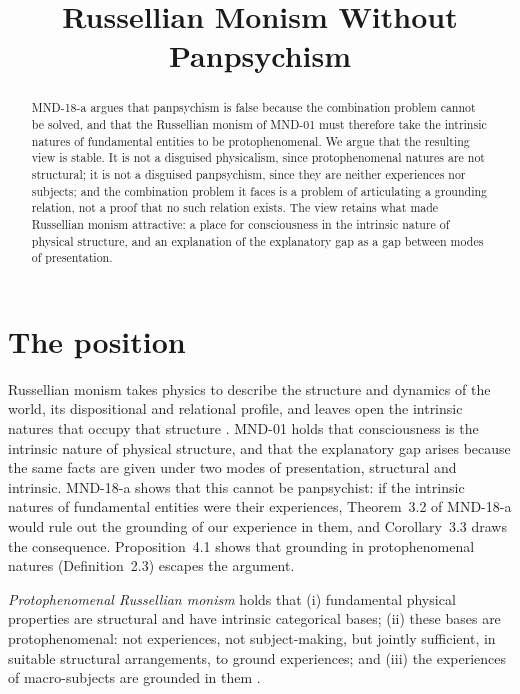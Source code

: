 \documentclass{situationist-preprint}
\title{Russellian Monism Without Panpsychism}
\begin{document}
\maketitle

\begin{abstract}
MND-18-a argues that panpsychism is false because the combination problem cannot be solved, and that the Russellian monism of MND-01 must therefore take the intrinsic natures of fundamental entities to be protophenomenal. We argue that the resulting view is stable. It is not a disguised physicalism, since protophenomenal natures are not structural; it is not a disguised panpsychism, since they are neither experiences nor subjects; and the combination problem it faces is a problem of articulating a grounding relation, not a proof that no such relation exists. The view retains what made Russellian monism attractive: a place for consciousness in the intrinsic nature of physical structure, and an explanation of the explanatory gap as a gap between modes of presentation.
\end{abstract}

\section{The position}

Russellian monism takes physics to describe the structure and dynamics of the world, its dispositional and relational profile, and leaves open the intrinsic natures that occupy that structure \citep{Russell1927}. MND-01 holds that consciousness is the intrinsic nature of physical structure, and that the explanatory gap arises because the same facts are given under two modes of presentation, structural and intrinsic. MND-18-a shows that this cannot be panpsychist: if the intrinsic natures of fundamental entities were their experiences, Theorem~3.2 of MND-18-a would rule out the grounding of our experience in them, and Corollary~3.3 draws the consequence. Proposition~4.1 shows that grounding in protophenomenal natures (Definition~2.3) escapes the argument.

\begin{definition}\label{d:prm}
\emph{Protophenomenal Russellian monism} holds that (i) fundamental physical properties are structural and have intrinsic categorical bases; (ii) these bases are protophenomenal: not experiences, not subject-making, but jointly sufficient, in suitable structural arrangements, to ground experiences; and (iii) the experiences of macro-subjects are grounded in them \citep{Chalmers2013}.
\end{definition}
\end{document}
